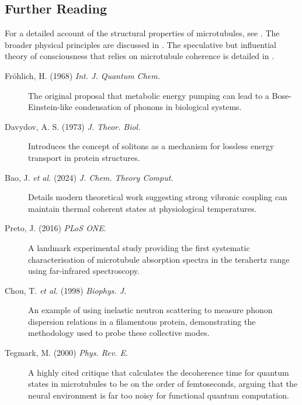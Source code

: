 \begin{importantbox}
\section*{Further Reading}
For a detailed account of the structural properties of microtubules, see . The broader physical principles are discussed in . The speculative but influential theory of consciousness that relies on microtubule coherence is detailed in .

\begin{description}
    \item[Fröhlich, H. (1968) \textit{Int. J. Quantum Chem.}] The original proposal that metabolic energy pumping can lead to a Bose-Einstein-like condensation of phonons in biological systems.
    \item[Davydov, A. S. (1973) \textit{J. Theor. Biol.}] Introduces the concept of solitons as a mechanism for lossless energy transport in protein structures.
    \item[Bao, J. \textit{et al.} (2024) \textit{J. Chem. Theory Comput.}] Details modern theoretical work suggesting strong vibronic coupling can maintain thermal coherent states at physiological temperatures.
\end{description}

\begin{description}
    \item[Preto, J. (2016) \textit{PLoS ONE}.] A landmark experimental study providing the first systematic characterisation of microtubule absorption spectra in the terahertz range using far-infrared spectroscopy.
    \item[Chou, T. \textit{et al.} (1998) \textit{Biophys. J.}] An example of using inelastic neutron scattering to measure phonon dispersion relations in a filamentous protein, demonstrating the methodology used to probe these collective modes.
\end{description}

\begin{description}
    \item[Tegmark, M. (2000) \textit{Phys. Rev. E}.] A highly cited critique that calculates the decoherence time for quantum states in microtubules to be on the order of femtoseconds, arguing that the neural environment is far too noisy for functional quantum computation.
\end{description}
\end{importantbox}
